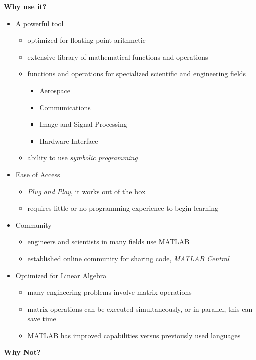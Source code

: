 \documentclass[11pt]{article}
\begin{document}
\vspace{5mm}
	\textbf{\Large Why use it?}
	\begin{itemize}

		\item A powerful tool
			\begin{itemize}	
				\item  optimized for floating point arithmetic
				\item extensive library of mathematical functions and operations 
				\item functions and operations for specialized scientific and engineering fields
					\begin{itemize}
						\item Aerospace
						\item Communications
						\item Image and Signal Processing 
						\item Hardware Interface
					\end{itemize}
				\item ability to use {\it symbolic programming }	
			\end{itemize}
		\item Ease of Access
			\begin{itemize}
				\item {\it Plug and Play}, it works out of the box
				\item requires little or no programming experience to begin learning
			\end{itemize}
		\item Community
			\begin{itemize}
				\item engineers and scientists in many fields use MATLAB
				\item established online community for sharing code,  {\it MATLAB Central}
			\end{itemize}
				
		\item Optimized for Linear Algebra
			\begin{itemize}
				\item many engineering problems involve matrix operations 
				\item matrix operations can be executed simultaneously, or in parallel, this can save time
				\item MATLAB has improved capabilities versus previously used languages 
			\end{itemize}	
		
	\end{itemize}
\textbf{\Large Why Not?}
\end{document}
